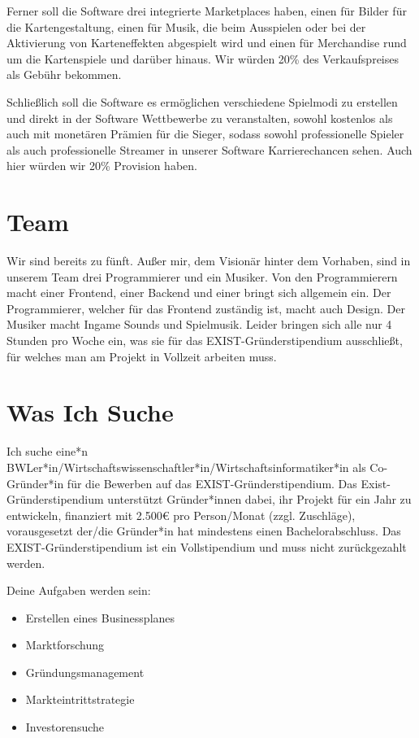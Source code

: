 \documentclass[fontsize=12]{scrartcl}
\begin{document}
	\noindent Ferner soll die Software drei integrierte Marketplaces haben, einen für Bilder für die Kartengestaltung, einen für Musik, die beim Ausspielen oder bei der Aktivierung von Karteneffekten abgespielt wird und einen für Merchandise rund um die Kartenspiele und darüber hinaus. Wir würden 20\% des Verkaufspreises als Gebühr bekommen.\hfill\newline
	
	\noindent Schließlich soll die Software es ermöglichen verschiedene Spielmodi zu erstellen und direkt in der Software Wettbewerbe zu veranstalten, sowohl kostenlos als auch mit monetären Prämien für die Sieger, sodass sowohl professionelle Spieler als auch professionelle Streamer in unserer Software Karrierechancen sehen. Auch hier würden wir 20\% Provision haben.
	
	\section{Team}
	
	Wir sind bereits zu fünft. Außer mir, dem Visionär hinter dem Vorhaben, sind in unserem Team drei Programmierer und ein Musiker. Von den Programmierern macht einer Frontend, einer Backend und einer bringt sich allgemein ein. Der Programmierer, welcher für das Frontend zuständig ist, macht auch Design. Der Musiker macht Ingame Sounds und Spielmusik. Leider bringen sich alle nur 4 Stunden pro Woche ein, was sie für das EXIST-Gründerstipendium ausschließt, für welches man am Projekt in Vollzeit arbeiten muss.
	
	\section{Was Ich Suche}
	
	Ich suche eine*n BWLer*in/Wirtschaftswissenschaftler*in/Wirtschaftsinformatiker*in als Co-Gründer*in für die Bewerben auf das EXIST-Gründerstipendium. Das Exist-Gründerstipendium unterstützt Gründer*innen dabei, ihr Projekt für ein Jahr zu entwickeln, finanziert mit 2.500€ pro Person/Monat (zzgl. Zuschläge), vorausgesetzt der/die Gründer*in hat mindestens einen Bachelorabschluss. Das EXIST-Gründerstipendium ist ein Vollstipendium und muss nicht zurückgezahlt werden.\hfill\newline
	
	\noindent Deine Aufgaben werden sein:
	
	\begin{itemize}
		
		\item Erstellen eines Businessplanes
		
		\item Marktforschung
		
		\item Gründungsmanagement
		
		\item Markteintrittstrategie
		
		\item Investorensuche
		
	\end{itemize}
	
\end{document}
